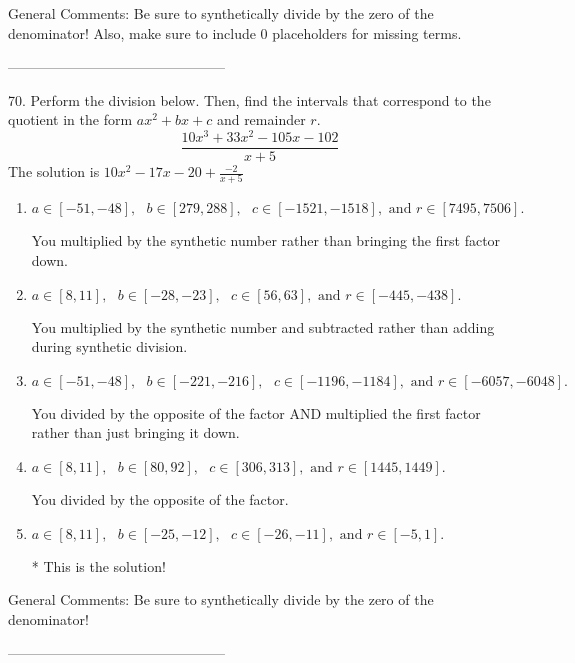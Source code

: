 \documentclass{extbook}[14pt]
\begin{document}
General Comments: Be sure to synthetically divide by the zero of the denominator! Also, make sure to include 0 placeholders for missing terms.

-----------------------------------------------

70. Perform the division below. Then, find the intervals that correspond to the quotient in the form $ax^2+bx+c$ and remainder $r$.
\[ \frac{10x^{3} +33 x^{2} -105 x -102}{x + 5} \] 
The solution is $ 10x^{2} -17 x -20 + \frac{-2}{x + 5} $ 

\begin{enumerate}[label=\Alph*.] 
\item $ a \in [-51, -48], \text{   } b \in [279, 288], \text{   } c \in [-1521, -1518], \text{   and   } r \in [7495, 7506]. $ 

  You multiplied by the synthetic number rather than bringing the first factor down. 
\item $ a \in [8, 11], \text{   } b \in [-28, -23], \text{   } c \in [56, 63], \text{   and   } r \in [-445, -438]. $ 

  You multiplied by the synthetic number and subtracted rather than adding during synthetic division. 
\item $ a \in [-51, -48], \text{   } b \in [-221, -216], \text{   } c \in [-1196, -1184], \text{   and   } r \in [-6057, -6048]. $ 

  You divided by the opposite of the factor AND multiplied the first factor rather than just bringing it down. 
\item $ a \in [8, 11], \text{   } b \in [80, 92], \text{   } c \in [306, 313], \text{   and   } r \in [1445, 1449]. $ 

  You divided by the opposite of the factor. 
\item $ a \in [8, 11], \text{   } b \in [-25, -12], \text{   } c \in [-26, -11], \text{   and   } r \in [-5, 1]. $ 

 * This is the solution! 
\end{enumerate} 
 
General Comments: Be sure to synthetically divide by the zero of the denominator!

-----------------------------------------------
\end{document}
